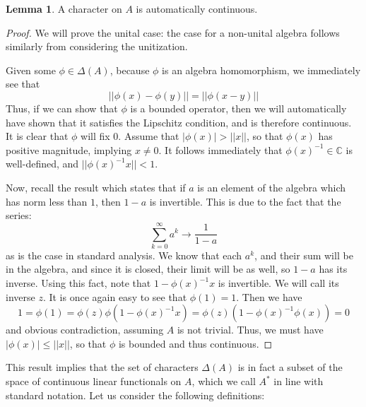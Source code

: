 \documentclass[aps,pra,showpacs,notitlepage,onecolumn,superscriptaddress,nofootinbib]{revtex4-1}
\theoremstyle{definition}
\newtheorem{lemma}{Lemma}[section]
\begin{document}
\begin{lemma}
  \label{lem:one}
  A character on $A$ is automatically continuous.
\end{lemma}

\begin{proof}
  We will prove the unital case: the case for a non-unital algebra follows similarly from considering the unitization.
  \newline

  \noindent Given some $\phi \in \Delta(A)$, because $\phi$ is an algebra homomorphism, we immediately see that
  \begin{equation}
    || \phi(x) - \phi(y) || = || \phi(x - y) ||
  \end{equation}
  Thus, if we can show that $\phi$ is a bounded operator, then we will automatically have shown that it satisfies the Lipschitz
  condition, and is therefore continuous. It is clear that $\phi$ will fix $0$. Assume that $|\phi(x)| > ||x||$, so that $\phi(x)$
  has positive magnitude, implying $x \neq 0$. It follows immediately that $\phi(x)^{-1} \in \mathbb{C}$ is well-defined, and $|| \phi(x)^{-1} x || < 1$.
  \newline

  \noindent Now, recall the result
  which states that if $a$ is an element of the algebra which has norm less than $1$, then $1 - a$ is invertible. This is due to the fact that the series:
  \begin{equation}
    \displaystyle\sum_{k = 0}^{\infty} a^{k} \rightarrow \frac{1}{1 - a}
  \end{equation}
  as is the case in standard analysis. We know that each $a^k$, and their sum will be in the algebra, and since it is closed, their limit will be as well, so $1 - a$
  has its inverse. Using this fact, note that $1 - \phi(x)^{-1} x$ is invertible. We will call its inverse $z$. It is once again easy to see that $\phi(1) = 1$. Then we have
  \begin{equation}
    1 = \phi(1) = \phi(z) \phi(1 - \phi(x)^{-1} x) = \phi(z) (1 - \phi(x)^{-1} \phi(x)) = 0
  \end{equation}
  and obvious contradiction, assuming $A$ is not trivial. Thus, we must have $|\phi(x)| \leq ||x||$, so that $\phi$ is bounded and thus continuous.
\end{proof}

\noindent This result implies that the set of characters $\Delta(A)$ is in fact a subset of the space of continuous linear functionals on $A$, which we call $A^{*}$
in line with standard notation. Let us consider the following definitions:
\end{document}
